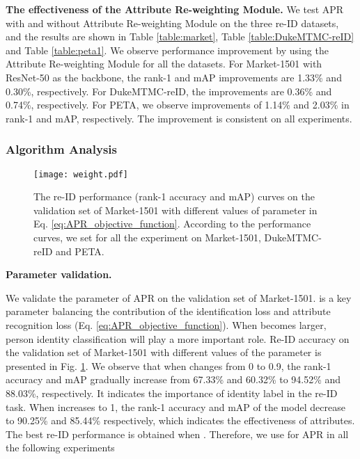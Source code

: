 \documentclass[5p,times,twocolumn]{elsarticle}
\begin{document}
\textbf{The effectiveness of the Attribute Re-weighting Module.} We test APR with and without Attribute Re-weighting Module on the three re-ID datasets, and the results are shown in Table \ref{table:market}, Table \ref{table:DukeMTMC-reID} and Table \ref{table:peta1}. We observe performance improvement by using the Attribute Re-weighting Module for all the datasets. For Market-1501 with ResNet-50 as the backbone, the rank-1 and mAP improvements are 1.33\% and 0.30\%, respectively. For DukeMTMC-reID, the improvements are 0.36\% and 0.74\%, respectively. For PETA, we observe improvements of 1.14\% and 2.03\% in rank-1 and mAP, respectively. The improvement is consistent on all experiments. 
    

\subsubsection{Algorithm Analysis}
    \begin{figure}[t]
        \begin{center}
            \texttt{[image: weight.pdf]}
        \end{center}
        \caption{ The re-ID performance (rank-1 accuracy and mAP) curves on the validation set of Market-1501 with different values of parameter  in Eq. \eqref{eq:APR_objective_function}. According to the performance curves, we set  for all the experiment on Market-1501, DukeMTMC-reID and PETA.
        }
        \label{fig:parameter}
    \end{figure}
\textbf{Parameter validation.} 


We validate the parameter  of APR on the validation set of Market-1501.  is a key parameter balancing the contribution of the identification loss and attribute recognition loss (Eq. \ref{eq:APR_objective_function}). When  becomes larger, person identity classification will play a more important role. Re-ID accuracy on the validation set of Market-1501 with different values of the parameter  is presented in Fig. \ref{fig:parameter}. We observe that when  changes from 0 to 0.9, the rank-1 accuracy and mAP gradually increase from 67.33\% and 60.32\% to 94.52\% and 88.03\%, respectively. It indicates the importance of identity label in the re-ID task. When  increases to 1, the rank-1 accuracy and mAP of the model decrease to 90.25\% and 85.44\% respectively, which indicates the effectiveness of attributes. The best re-ID performance is obtained when . Therefore, we use   for APR in all the following experiments
\end{document}
